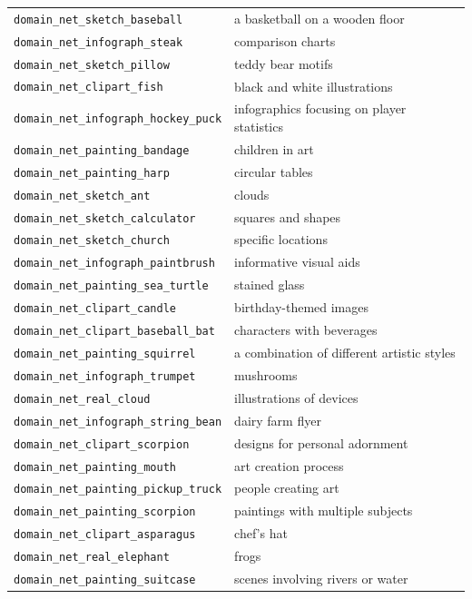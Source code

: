 \documentclass{article} %
\begin{document}
\begin{longtable}{p{} p{}}
\texttt{domain\_net\_sketch\_baseball} & a basketball on a wooden floor \\
\texttt{domain\_net\_infograph\_steak} & comparison charts \\
\texttt{domain\_net\_sketch\_pillow} & teddy bear motifs \\
\texttt{domain\_net\_clipart\_fish} & black and white illustrations \\
\texttt{domain\_net\_infograph\_hockey\_puck} & infographics focusing on player statistics \\
\texttt{domain\_net\_painting\_bandage} & children in art \\
\texttt{domain\_net\_painting\_harp} & circular tables \\
\texttt{domain\_net\_sketch\_ant} & clouds \\
\texttt{domain\_net\_sketch\_calculator} & squares and shapes \\
\texttt{domain\_net\_sketch\_church} & specific locations \\
\texttt{domain\_net\_infograph\_paintbrush} & informative visual aids \\
\texttt{domain\_net\_painting\_sea\_turtle} & stained glass \\
\texttt{domain\_net\_clipart\_candle} & birthday-themed images \\
\texttt{domain\_net\_clipart\_baseball\_bat} & characters with beverages \\
\texttt{domain\_net\_painting\_squirrel} & a combination of different artistic styles \\
\texttt{domain\_net\_infograph\_trumpet} & mushrooms \\
\texttt{domain\_net\_real\_cloud} & illustrations of devices \\
\texttt{domain\_net\_infograph\_string\_bean} & dairy farm flyer \\
\texttt{domain\_net\_clipart\_scorpion} & designs for personal adornment \\
\texttt{domain\_net\_painting\_mouth} & art creation process \\
\texttt{domain\_net\_painting\_pickup\_truck} & people creating art \\
\texttt{domain\_net\_painting\_scorpion} & paintings with multiple subjects \\
\texttt{domain\_net\_clipart\_asparagus} & chef's hat \\
\texttt{domain\_net\_real\_elephant} & frogs \\
\texttt{domain\_net\_painting\_suitcase} & scenes involving rivers or water \\

\end{longtable}
\end{document}
